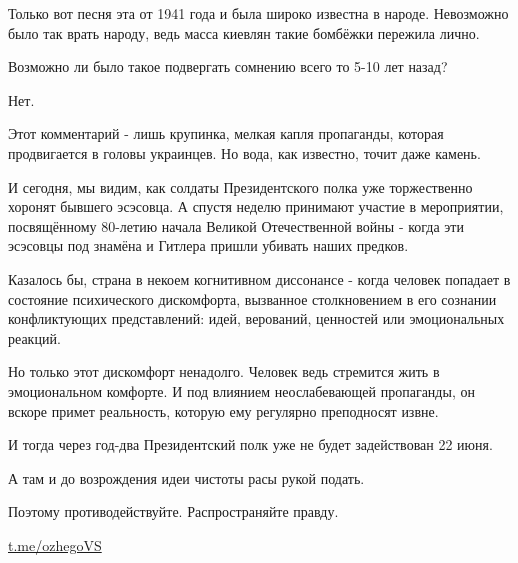 Только вот песня эта от 1941 года и была широко известна в народе. Невозможно
было так врать народу, ведь масса киевлян такие бомбёжки пережила лично.

Возможно ли было такое подвергать сомнению всего то 5-10 лет назад?

Нет.

Этот комментарий - лишь крупинка, мелкая капля пропаганды, которая продвигается
в головы украинцев. Но вода, как известно, точит даже камень.

И сегодня, мы видим, как солдаты Президентского полка уже торжественно хоронят
бывшего эсэсовца. А спустя неделю принимают участие в мероприятии, посвящённому
80-летию начала Великой Отечественной войны - когда эти эсэсовцы под знамёна и
Гитлера пришли убивать наших предков.

Казалось бы, страна в некоем  когнитивном диссонансе - когда человек попадает в
состояние психического дискомфорта, вызванное столкновением в его сознании
конфликтующих представлений: идей, верований, ценностей или эмоциональных
реакций.

Но только этот дискомфорт ненадолго. Человек ведь стремится жить в
эмоциональном комфорте. И под влиянием неослабевающей пропаганды, он вскоре
примет реальность, которую ему регулярно преподносят извне. 

И тогда через год-два Президентский полк уже не будет задействован 22 июня. 

А там и до возрождения идеи чистоты расы рукой подать.

Поэтому противодействуйте. Распространяйте правду.

\url{t.me/ozhegoVS}
